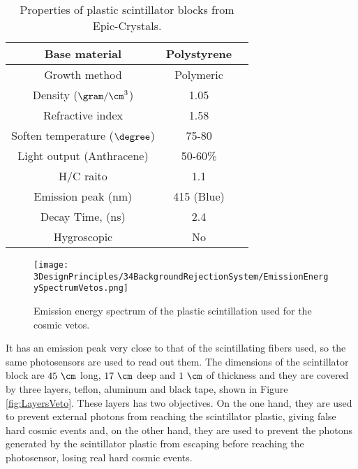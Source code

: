 \begin{table}[]
\begin{center}
\begin{tabular}{|c|c|c|}
\hline \hline 
Base material & Polystyrene \\ \hline
Growth method & Polymeric \\ \hline
Density ($\gram/\cm^3$)& 1.05 \\ \hline
Refractive index & 1.58 \\ \hline
Soften temperature ($\degree$) & 75-80 \\ \hline
Light output (Anthracene) & 50-60\% \\ \hline
H/C raito & 1.1 \\ \hline
Emission peak (nm) & 415 (Blue) \\ \hline
Decay Time, (ns) & 2.4 \\ \hline
Hygroscopic & No \\ \hline
\end{tabular}
\caption{Properties of plastic scintillator blocks from Epic-Crystals. \cite{ScintillatorVeto}}
\label{tab:ParametersScintillatorVeto}
\end{center}
\end{table}

\begin{figure}[]
\centering
\texttt{[image: 3DesignPrinciples/34BackgroundRejectionSystem/EmissionEnergySpectrumVetos.png]}
\caption{Emission energy spectrum of the plastic scintillation used for the cosmic vetos.\label{fig:EmissionEnergySpectrumVeto}~\cite{ScintillatorVeto}}
\end{figure}

It has an emission peak very close to that of the scintillating fibers used, so the same photosensors are used to read out them. The dimensions of the scintillator block are $45~\cm$ long, $17~\cm$ deep and $1~\cm$ of thickness and they are covered by three layers, teflon, aluminum and black tape, shown in Figure \ref{fig:LayersVeto}. These layers has two objectives. On the one hand, they are used to prevent external photons from reaching the scintillator plastic, giving false hard cosmic events and, on the other hand, they are used to prevent the photons generated by the scintillator plastic from escaping before reaching the photosensor, losing real hard cosmic events.

